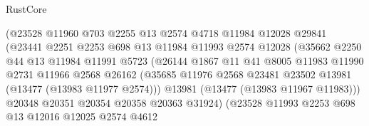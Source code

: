 \begin{lexlean}{RustCore}
\begin{coremodule}
                              (@23528
                                @11960
                                @703
                                @2255
                                @13
                                @2574
                                @4718
                                @11984
                                @12028
                                @29841
                                (@23441
                                  @2251
                                  @2253
                                  @698
                                  @13
                                  @11984
                                  @11993
                                  @2574
                                  @12028
                                  (@35662
                                    @2250
                                    @44
                                    @13
                                    @11984
                                    @11991
                                    @5723
                                    (@26144
                                      @1867
                                      @11
                                      @41
                                      @8005
                                      @11983
                                      @11990
                                      @2731
                                      @11966
                                      @2568
                                      @26162
                                      (@35685
                                        @11976
                                        @2568
                                        @23481
                                        @23502
                                        @13981
                                        (@13477 (@13983 @11977 @2574)))
                                      @13981
                                      (@13477 (@13983 @11967 @11983)))
                                    @20348
                                    @20351
                                    @20354
                                    @20358
                                    @20363
                                    @31924)
                                  (@23528
                                    @11993
                                    @2253
                                    @698
                                    @13
                                    @12016
                                    @12025
                                    @2574
                                    @4612

\end{coremodule}
\end{lexlean}
